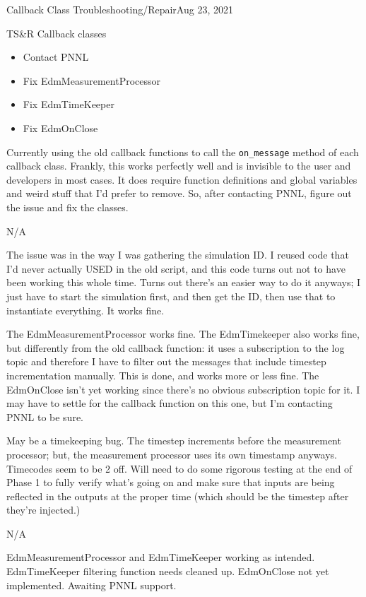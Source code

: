 \begin{entry}{Callback Class Troubleshooting/Repair}{Aug 23, 2021}
    \objective 
    
    TS\&R Callback classes

    \outline

    \begin{itemize}
        \item Contact PNNL
        \item Fix EdmMeasurementProcessor
        \item Fix EdmTimeKeeper
        \item Fix EdmOnClose

    \end{itemize}

    \procedures
    
    Currently using the old callback functions to call the \verb"on_message" method of each callback class. Frankly, this works
    perfectly well and is invisible to the user and developers in most cases. It does require function definitions and
    global variables and weird stuff that I'd prefer to remove. So, after contacting PNNL, figure out the issue and fix
    the classes.

    \parameters
    
    N/A

    \observations
    
    The issue was in the way I was gathering the simulation ID. I reused code that I'd never actually USED in the old
    script, and this code turns out not to have been working this whole time. Turns out there's an easier way to do it
    anyways; I just have to start the simulation first, and then get the ID, then use that to instantiate everything. It
    works fine.

    The EdmMeasurementProcessor works fine. The EdmTimekeeper also works fine, but differently from the old callback
    function: it uses a subscription to the log topic and therefore I have to filter out the messages that include
    timestep incrementation manually. This is done, and works more or less fine. The EdmOnClose isn't yet working since
    there's no obvious subscription topic for it. I may have to settle for the callback function on this one, but
    I'm contacting PNNL to be sure.

    May be a timekeeping bug. The timestep increments before the measurement processor; but, the measurement processor
    uses its own timestamp anyways. Timecodes seem to be 2 off. Will need to do some rigorous testing at the end of
    Phase 1 to fully verify what's going on and make sure that inputs are being reflected in the outputs at the proper
    time (which should be the timestep after they're injected.)

    \data
    
    N/A

    \results
    
    EdmMeasurementProcessor and EdmTimeKeeper working as intended. EdmTimeKeeper filtering function needs cleaned up.
    EdmOnClose not yet implemented. Awaiting PNNL support.

\end{entry}


